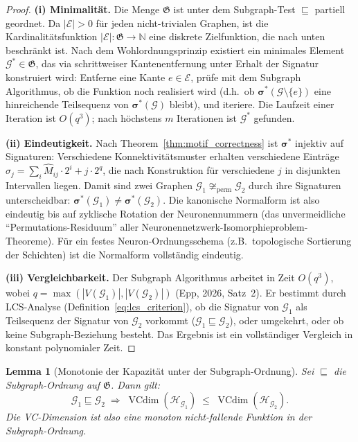 \documentclass[12pt, a4paper, openany]{report}
\newtheorem{lemma}[theorem]{Lemma}
\newcommand{\N}{\mathbb{N}}
\newcommand{\calG}{\mathcal{G}}
\newcommand{\calH}{\mathcal{H}}
\newcommand{\calE}{\mathcal{E}}
\DeclareMathOperator{\VC}{VCdim}
\begin{document}
\begin{proof}
\textbf{(i) Minimalität.}
Die Menge $\mathfrak{G}$ ist unter dem Subgraph-Test $\sqsubseteq$ partiell
geordnet.  Da $|\calE| > 0$ für jeden nicht-trivialen Graphen, ist die
Kardinalitätsfunktion $|\calE| : \mathfrak{G} \to \N$ eine diskrete
Zielfunktion, die nach unten beschränkt ist.  Nach dem
Wohlordnungsprinzip existiert ein minimales Element $\calG^* \in \mathfrak{G}$,
das via schrittweiser Kantenentfernung unter Erhalt der Signatur konstruiert
wird: Entferne eine Kante $e \in \calE$, prüfe mit dem Subgraph Algorithmus,
ob die Funktion noch realisiert wird (d.h.\ ob $\bm{\sigma}^*(\calG \setminus \{e\})$
eine hinreichende Teilsequenz von $\bm{\sigma}^*(\calG)$ bleibt), und iteriere.
Die Laufzeit einer Iteration ist $O(q^3)$; nach höchstens $m$ Iterationen
ist $\calG^*$ gefunden.

\textbf{(ii) Eindeutigkeit.}
Nach Theorem~\ref{thm:motif_correctness} ist $\bm{\sigma}^*$ injektiv auf
Signaturen: Verschiedene Konnektivitätsmuster erhalten verschiedene Einträge
$\sigma_j = \sum_i \hat{M}_{ij} \cdot 2^i + j \cdot 2^q$, die nach
Konstruktion für verschiedene $j$ in disjunkten Intervallen liegen.  Damit
sind zwei Graphen $\calG_1 \not\cong_{\mathrm{perm}} \calG_2$ durch ihre
Signaturen unterscheidbar: $\bm{\sigma}^*(\calG_1) \neq \bm{\sigma}^*(\calG_2)$.
Die kanonische Normalform ist also eindeutig bis auf zyklische Rotation
der Neuronennummern (das unvermeidliche ``Permutations-Residuum'' aller
Neuronennetzwerk-Isomorphieproblem-Theoreme).  Für ein festes Neuron-Ordnungsschema
(z.B.\ topologische Sortierung der Schichten) ist die Normalform vollständig
eindeutig.

\textbf{(iii) Vergleichbarkeit.}
Der Subgraph Algorithmus arbeitet in Zeit $O(q^3)$, wobei $q = \max(|V(\calG_1)|,
|V(\calG_2)|)$ (Epp, 2026, Satz~2).  Er bestimmt durch LCS-Analyse
(Definition~\ref{eq:lcs_criterion}), ob die Signatur von $\calG_1$ als
Teilsequenz der Signatur von $\calG_2$ vorkommt ($\calG_1 \sqsubseteq \calG_2$),
oder umgekehrt, oder ob keine Subgraph-Beziehung besteht.  Das Ergebnis
ist ein vollständiger Vergleich in konstant polynomialer Zeit.
\end{proof}

\begin{lemma}[Monotonie der Kapazität unter der Subgraph-Ordnung]
\label{lem:capacity_monotone}
Sei $\sqsubseteq$ die Subgraph-Ordnung auf $\mathfrak{G}$.  Dann gilt:
\[
  \calG_1 \sqsubseteq \calG_2
  \;\Rightarrow\;
  \VC(\calH_{\calG_1}) \;\leq\; \VC(\calH_{\calG_2}).
\]
Die VC-Dimension ist also eine monoton nicht-fallende Funktion in der
Subgraph-Ordnung.
\end{lemma}
\end{document}
